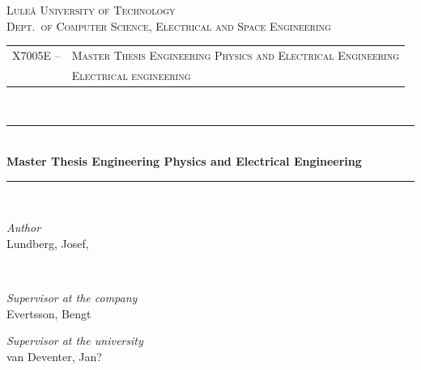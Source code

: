 \newcommand{\HRule}{\rule{\linewidth}{0.5mm}}
\center %


\textsc{\LARGE Luleå University of Technology}\\[1.5cm] %

\textsc{\Large Dept.\ of Computer Science, Electrical and Space Engineering}\\[0.5cm] %

\begin{centering}
\begin{tabular}{l l}
\textsc{\large X7005E --}	& \textsc{\large Master Thesis Engineering Physics and Electrical Engineering}\\ %
				& \textsc{\large Electrical engineering} %
\end{tabular}
\end{centering}\\[0.5cm]

\HRule\\[0.8cm]

{\huge\bfseries Master Thesis Engineering Physics and Electrical Engineering \project}\\[0.4cm] %

\HRule\\[1.5cm]

\begin{minipage}{0.4\textwidth}
	\begin{flushleft}
		\large
		\emph{Author}\\
		Lundberg, Josef, \\ 
	\end{flushleft}
\end{minipage}
~
\begin{minipage}{0.4\textwidth}
	\begin{flushright}
		\large
		\textit{Supervisor at the company}\\
		Evertsson, Bengt
	\end{flushright}
	\begin{flushright}
		\large
		\textit{Supervisor at the university}\\
		van Deventer, Jan?
	\end{flushright}
\end{minipage}

